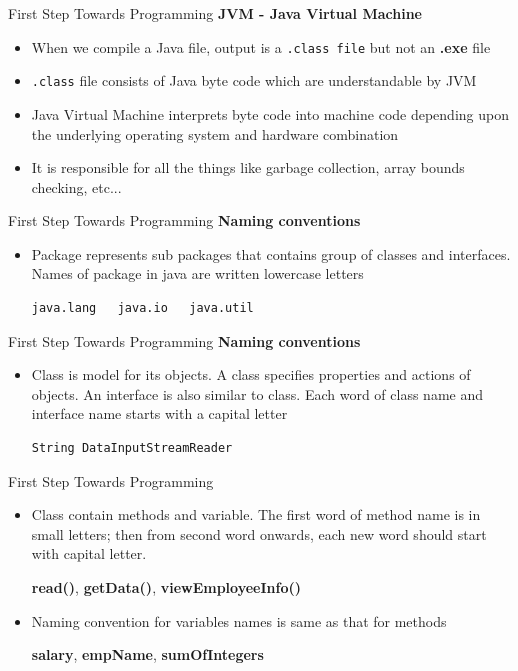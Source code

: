 \documentclass[14pt]{beamer}
\begin{document}
\begin{frame}{First Step Towards Programming}
 \textbf{JVM - Java Virtual Machine}
 \begin{itemize}
  \item When we compile a Java file, output is a \lstinline!.class file! but not an \textbf{.exe} file 
  \item \lstinline!.class! file consists of Java byte code which are understandable by JVM
  \item Java Virtual Machine interprets byte code into machine code depending upon the underlying operating system and hardware combination
  \item It is responsible for all the things like garbage collection, array bounds checking, etc...
 \end{itemize}
\end{frame}

\begin{frame}[fragile]{First Step Towards Programming}
 \textbf{Naming conventions}
 \begin{itemize}
  \item Package represents sub packages that contains group of classes and interfaces. Names of package in java are written lowercase letters
  \begin{verbatim}
java.lang   java.io   java.util
  \end{verbatim}
 \end{itemize}
\end{frame}

\begin{frame}[fragile]{First Step Towards Programming}
 \textbf{Naming conventions}
 \begin{itemize}
  \item Class is model for its objects. A class specifies properties and actions of objects. An interface is also similar to class. Each word of class name and interface name starts with a capital letter
  \begin{verbatim}
String DataInputStreamReader
  \end{verbatim}
 \end{itemize}
\end{frame}

\begin{frame}[fragile]{First Step Towards Programming}
 \begin{itemize}
  \item Class contain methods and variable. The first word of method name is in small letters; then from second word onwards, each new word should start with capital letter.
  
  \textbf{read()}, \textbf{getData()}, \textbf{viewEmployeeInfo()}
  
 \item Naming convention for variables names is same as that for methods
  
  \textbf{salary}, \textbf{empName}, \textbf{sumOfIntegers}
\end{itemize}
\end{frame}
\end{document}
